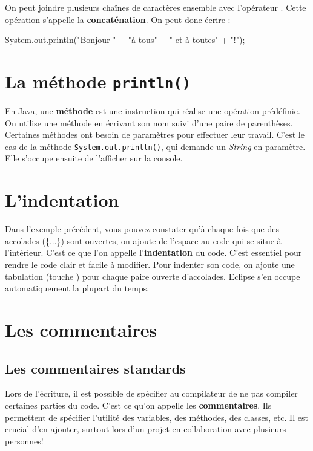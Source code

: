 \documentclass[12pt]{report}
\newcommand{\commande}[1]{%
\tcbox[on line, size=fbox, colframe=black, boxrule=0.75pt, tcbox raise base]{#1} %
}
\begin{document}
On peut joindre plusieurs chaînes de caractères ensemble avec l'opérateur \commande{+}. Cette opération s'appelle la \textbf{concaténation}. On peut donc écrire :%
\begin{code}
System.out.println("Bonjour " + "à tous" + " et à toutes" + "!");
\end{code} 





%
\section{La méthode \texttt{println()}}
%
En Java, une \textbf{méthode} est une instruction qui réalise une opération prédéfinie. On utilise une méthode en écrivant son nom suivi d'une paire de parenthèses. Certaines méthodes ont besoin de paramètres pour effectuer leur travail. C'est le cas de la méthode \texttt{System.out.println()}, qui demande un \emph{String} en paramètre. Elle s'occupe ensuite de l'afficher sur la console.




%
\section{L'indentation}
%
Dans l'exemple précédent, vous pouvez constater qu'à chaque fois que des accolades (\{...\}) sont ouvertes, on ajoute de l'espace au code qui se situe à l'intérieur. C'est ce que l'on appelle l'\textbf{indentation} du code. C'est essentiel pour rendre le code clair et facile à modifier. Pour indenter son code, on ajoute une tabulation (touche \commande{Tab $\rightleftarrows$}) pour chaque paire ouverte d'accolades. Eclipse s'en occupe automatiquement la plupart du temps.







%
\section{Les commentaires}
%
%
%
\subsection{Les commentaires standards}
%
%
Lors de l'écriture, il est possible de spécifier au compilateur de ne pas compiler certaines parties du code. C'est ce qu'on appelle les \textbf{commentaires}. Ils permettent de spécifier l'utilité des variables, des méthodes, des classes, etc. Il est crucial d'en ajouter, surtout lors d'un projet en collaboration avec plusieurs personnes!
\end{document}
